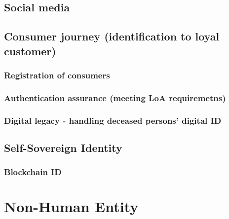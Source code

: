 \hypertarget{social-media}{%
\section{Social media}\label{social-media}}

\hypertarget{consumer-journey-identification-to-loyal-customer}{%
\section{Consumer journey (identification to loyal
customer)}\label{consumer-journey-identification-to-loyal-customer}}

\hypertarget{registration-of-consumers}{%
\subsection{Registration of
consumers}\label{registration-of-consumers}}

\hypertarget{authentication-assurance-meeting-loa-requiremetns}{%
\subsection{Authentication assurance (meeting LoA
requiremetns)}\label{authentication-assurance-meeting-loa-requiremetns}}

\hypertarget{digital-legacy---handling-deceased-persons-digital-id}{%
\subsection{Digital legacy - handling deceased persons' digital
ID}\label{digital-legacy---handling-deceased-persons-digital-id}}

\hypertarget{self-sovereign-identity}{%
\section{Self-Sovereign Identity}\label{self-sovereign-identity}}

\hypertarget{blockchain-id}{%
\subsection{Blockchain ID}\label{blockchain-id}}

\hypertarget{non-human-entity}{%
\chapter{Non-Human Entity}\label{non-human-entity}}

